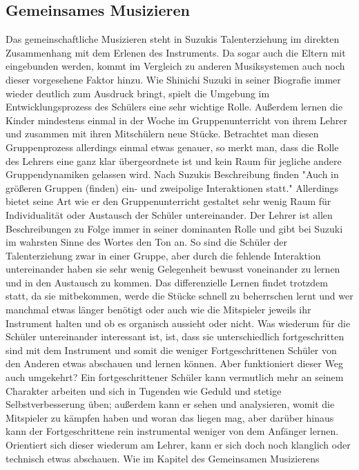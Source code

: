 \subsection{Gemeinsames Musizieren}
Das gemeinschaftliche Musizieren steht in Suzukis Talenterziehung im direkten
Zusammenhang mit dem Erlenen des Instruments. Da sogar auch die Eltern mit
eingebunden werden, kommt im Vergleich zu anderen Musiksystemen auch noch dieser
vorgesehene Faktor hinzu. Wie Shinichi Suzuki in seiner Biografie immer wieder
deutlich zum Ausdruck bringt, spielt die Umgebung im Entwicklungsprozess des
Schülers eine sehr wichtige Rolle. Außerdem lernen die Kinder mindestens einmal
in der Woche im Gruppenunterricht von ihrem Lehrer und zusammen mit ihren
Mitschülern neue Stücke. Betrachtet man diesen Gruppenprozess allerdings einmal
etwas genauer, so merkt man, dass die Rolle des Lehrers eine ganz klar
übergeordnete ist und kein Raum für jegliche andere Gruppendynamiken gelassen
wird. Nach Suzukis Beschreibung finden "Auch in größeren Gruppen (finden) ein-
und zweipolige Interaktionen statt." \autocite[30]{suzuki:erziehung_ist_liebe}
Allerdings bietet seine Art wie er den Gruppenunterricht gestaltet sehr wenig
Raum für Individualität oder Austausch der Schüler untereinander. Der Lehrer ist
allen Beschreibungen zu Folge immer in seiner dominanten Rolle und gibt bei
Suzuki im wahrsten Sinne des Wortes den Ton an. So sind die Schüler der
Talenterziehung zwar in einer Gruppe, aber durch die fehlende Interaktion
untereinander haben sie sehr wenig Gelegenheit bewusst voneinander zu lernen und
in den Austausch zu kommen. Das differenzielle Lernen findet trotzdem statt, da
sie mitbekommen, werde die Stücke schnell zu beherrschen lernt und wer manchmal
etwas länger benötigt oder auch wie die Mitspieler jeweils ihr Instrument halten
und ob es organisch aussieht oder nicht. Was wiederum für die Schüler
untereinander interessant ist, ist, dass sie unterschiedlich fortgeschritten
sind mit dem Instrument und somit die weniger Fortgeschrittenen Schüler von den
Anderen etwas abschauen und lernen können. Aber funktioniert dieser Weg auch
umgekehrt? Ein fortgeschrittener Schüler kann vermutlich mehr an seinem
Charakter arbeiten und sich in Tugenden wie Geduld und stetige
Selbstverbesserung üben; außerdem kann er sehen und analysieren, womit die
Mitspieler zu kämpfen haben und woran das liegen mag, aber darüber hinaus kann
der Fortgeschrittene rein instrumental weniger von dem Anfänger lernen.
Orientiert sich dieser wiederum am Lehrer, kann er sich doch noch klanglich oder
technisch etwas abschauen. Wie im Kapitel des Gemeinsamen Musizierens
